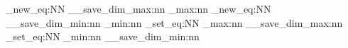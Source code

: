 \usepackage{times}
\ExplSyntaxOn
\cs_new_eq:NN \__save_dim_max:nn \dim_max:nn
\cs_new_eq:NN \__save_dim_min:nn \dim_min:nn
\AtBeginDocument
{
    \cs_set_eq:NN \dim_max:nn \__save_dim_max:nn
    \cs_set_eq:NN \dim_min:nn \__save_dim_min:nn
}
\ExplSyntaxOff
\usepackage{fontspec,xunicode,xltxtra}      %

\usepackage[xetex, unicode,
              pdfstartview=FitH,
              CJKbookmarks=true,
              bookmarksnumbered=true,
              bookmarksopen=true,
              colorlinks=true,
			  citecolor=black,
              linkcolor=black,
              anchorcolor=black,
              urlcolor=black,
              breaklinks=true
            ]{hyperref}

